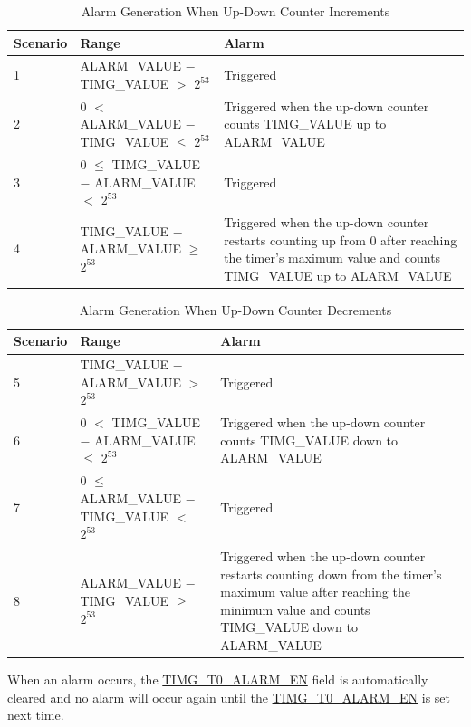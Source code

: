 \documentclass[main\_\_EN.tex]{subfiles}
\begin{document}
\begin{table}[H]
\centering
\caption{Alarm Generation When Up-Down Counter Increments}
\label{tab:timg-alarm-generation-up}

\begin{tabular}{|l|l|m{7cm}|}
\hline
\rowcolor{lightgray}
    \textbf{Scenario} & \textbf{Range} & \textbf{Alarm} \\\hline
     1 & ALARM\_VALUE $-$ TIMG\_VALUE $>$ $2^{53}$ & Triggered \\\hline
     2 & 0 $<$ ALARM\_VALUE $-$ TIMG\_VALUE $\leq$ $2^{53}$ & Triggered when the up-down counter counts TIMG\_VALUE up to ALARM\_VALUE \\\hline
     3 & 0 $\leq$ TIMG\_VALUE $-$ ALARM\_VALUE $<$ $2^{53}$ & Triggered \\\hline
     4 & TIMG\_VALUE $-$ ALARM\_VALUE $\geq$ $2^{53}$ & Triggered when the up-down counter restarts counting up from 0 after reaching the timer's maximum value and counts TIMG\_VALUE up to ALARM\_VALUE \\\hline

\end{tabular}
\end{table}

\begin{table}[H]
\centering
\caption{Alarm Generation When Up-Down Counter Decrements}
\label{tab:timg-alarm-generation-down}

\begin{tabular}{|l|l|m{7cm}|}
\hline
\rowcolor{lightgray}
    \textbf{Scenario} & \textbf{Range} & \textbf{Alarm} \\\hline
     5 & TIMG\_VALUE $-$ ALARM\_VALUE  $>$ $2^{53}$ & Triggered \\\hline
     6 &  0 $<$ TIMG\_VALUE $-$ ALARM\_VALUE $\leq$ $2^{53}$ & Triggered when the up-down counter counts TIMG\_VALUE down to ALARM\_VALUE \\\hline
     7 & 0 $\leq$ ALARM\_VALUE $-$ TIMG\_VALUE $<$ $2^{53}$ & Triggered \\\hline
     8 & ALARM\_VALUE $-$ TIMG\_VALUE $\geq$ $2^{53}$ & Triggered when the up-down counter restarts counting down from the timer's maximum value after reaching the minimum value and counts TIMG\_VALUE down to ALARM\_VALUE \\\hline

\end{tabular}
\end{table}

When an alarm occurs, the \hyperref[fielddesc:TIMGTXALARMEN]{TIMG\_T0\_ALARM\_EN} field is automatically cleared and no alarm will occur again until the \hyperref[fielddesc:TIMGTXALARMEN]{TIMG\_T0\_ALARM\_EN} is set next time.
\end{document}
